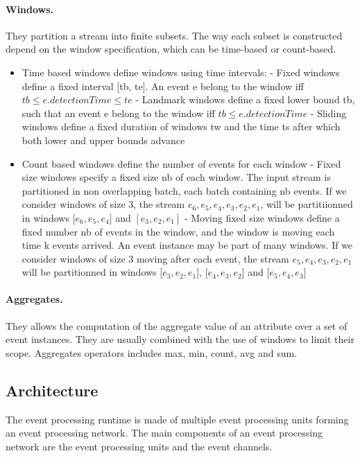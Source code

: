 \documentclass[a4paper,twoside]{article}
\begin{document}
\paragraph{Windows.} They partition a stream into finite subsets. The way each subset is constructed depend on the window specification, which can be time-based or count-based. 
\begin{itemize}
\item Time based windows define windows using time intervals:
\subitem - Fixed windows define a fixed interval [tb, te]. An event e belong to the window iff $ tb \leq e.detectionTime \leq te$
\subitem - Landmark windows define a fixed lower bound tb, such that an event e belong to the window iff $ tb \leq e.detectionTime $
\subitem - Sliding windows define a fixed duration of windows tw and the time ts after which both lower and upper bounds advance
\item Count based windows define the number of events for each window
\subitem - Fixed size windows specify a fixed size nb of each window. The input stream is partitioned in non overlapping batch, each batch containing nb events. If we consider windows of size 3, the stream $e_6, e_5,e_4, e_3, e_2, e_1$, will be partitiionned in windows [$e_6, e_5,e_4]$ and $[e_3, e_2, e_1]$
\subitem - Moving fixed size windows define a fixed number nb of events in the window, and the window is moving each time k events arrived. An event instance may be part of many windows. If we consider windows of size 3 moving after each event, the stream $e_5,e_4, e_3, e_2, e_1$ will be partitionned in windows [$e_3, e_2, e_1$], [$e_4,e_3, e_2$] and [$e_5, e_4,e_3$]
\end{itemize}

\paragraph{Aggregates.} They allows the computation of the aggregate value of an attribute over a set of event instances. They are usually combined with the use of windows to limit their scope. Aggregates operators includes max, min, count, avg and sum. 

\subsection{Architecture}
The event processing runtime is made of multiple event processing units forming an event processing network. The main components of an event processing network are the event processing units and the event channels.
\end{document}

